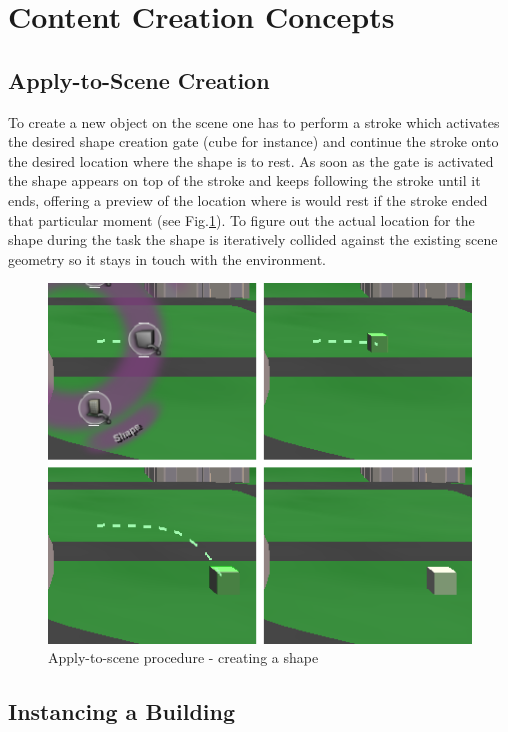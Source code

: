 \section{Content Creation Concepts}

\subsection{Apply-to-Scene Creation}
\label{design:apply-to-scene}

To create a new object on the scene one has to perform a stroke which activates the desired shape creation gate (cube for instance)
and continue the stroke onto the desired location where the shape is to rest. As soon as the gate is activated the shape appears
on top of the stroke and keeps following the stroke until it ends, offering a preview of the location where is would rest
if the stroke ended that particular moment (see Fig.\ref{fig:apply-to-scene}).
To figure out the actual location for the shape during the task the shape is iteratively collided against the
existing scene geometry so it stays in touch with the environment.

\begin{figure}[ht]
	\centering
		\includegraphics[scale=0.5]{gfx/apply-to-scene.png}
	\caption{Apply-to-scene procedure - creating a shape}
	\label{fig:apply-to-scene}
\end{figure}



\subsection{Instancing a Building}
\label{design:building}

